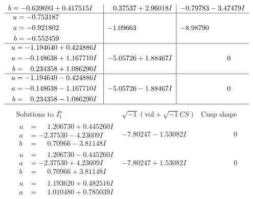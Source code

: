 \documentclass[1p]{elsarticle_modified}
\theoremstyle{definition}
\newcommand{\I}{\sqrt{-1}}
\begin{document}
$$\begin{array}{c|c|c}
\begin{aligned}
b &= -0.639693 + 0.417515 I\end{aligned}
 & \phantom{-}0.37537 + 2.96018 I & -0.79783 - 3.47479 I \\ \hline\begin{aligned}
u &= -0.753187\phantom{ +0.000000I} \\
a &= -0.921802\phantom{ +0.000000I} \\
b &= -0.552459\phantom{ +0.000000I}\end{aligned}
 & -1.09663\phantom{ +0.000000I} & -8.98790\phantom{ +0.000000I} \\ \hline\begin{aligned}
u &= -1.194640 + 0.424886 I \\
a &= -0.148638 + 1.167710 I \\
b &= \phantom{-}0.234358 + 1.086290 I\end{aligned}
 & -5.05726 + 1.88467 I & \phantom{-0.000000 } 0 \\ \hline\begin{aligned}
u &= -1.194640 - 0.424886 I \\
a &= -0.148638 - 1.167710 I \\
b &= \phantom{-}0.234358 - 1.086290 I\end{aligned}
 & -5.05726 - 1.88467 I & \phantom{-0.000000 } 0\\
 \hline 
 \end{array}$$\newpage$$\begin{array}{c|c|c}  
\text{Solutions to }I^u_{1}& \I (\text{vol} + \sqrt{-1}CS) & \text{Cusp shape}\\
 \hline 
\begin{aligned}
u &= \phantom{-}1.206730 + 0.445260 I \\
a &= -2.37530 - 4.23609 I \\
b &= \phantom{-}0.70966 - 3.81148 I\end{aligned}
 & -7.80247 - 1.53082 I & \phantom{-0.000000 } 0 \\ \hline\begin{aligned}
u &= \phantom{-}1.206730 - 0.445260 I \\
a &= -2.37530 + 4.23609 I \\
b &= \phantom{-}0.70966 + 3.81148 I\end{aligned}
 & -7.80247 + 1.53082 I & \phantom{-0.000000 } 0 \\ \hline\begin{aligned}
u &= \phantom{-}1.193620 + 0.482516 I \\
a &= \phantom{-}1.010480 + 0.785039 I \\

\end{aligned}
\end{array}$$
\end{document}
